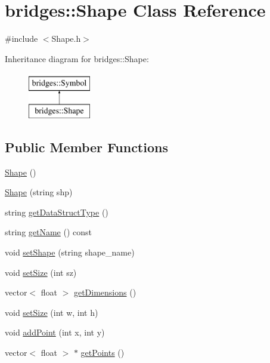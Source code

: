 \hypertarget{classbridges_1_1_shape}{}\section{bridges\+:\+:Shape Class Reference}
\label{classbridges_1_1_shape}


{\ttfamily \#include $<$Shape.\+h$>$}

Inheritance diagram for bridges\+:\+:Shape\+:\begin{figure}[H]
\begin{center}
\leavevmode
\includegraphics[height=2.000000cm]{classbridges_1_1_shape}
\end{center}
\end{figure}
\subsection*{Public Member Functions}
\begin{DoxyCompactItemize}
\item 
\mbox{\hyperlink{classbridges_1_1_shape_a1bab5bd0c3c89c6274a5a309b2aa184a}{Shape}} ()
\item 
\mbox{\hyperlink{classbridges_1_1_shape_a5ad5fa644f2c62c156427d0fef463f5b}{Shape}} (string shp)
\item 
string \mbox{\hyperlink{classbridges_1_1_shape_ac1aa859856aad0bac2716f98e87028ba}{get\+Data\+Struct\+Type}} ()
\item 
string \mbox{\hyperlink{classbridges_1_1_shape_a0365e2488fdaca0a2815be49dec93105}{get\+Name}} () const
\item 
void \mbox{\hyperlink{classbridges_1_1_shape_aed60b6e9a673eebc2b53d9053227a7c5}{set\+Shape}} (string shape\+\_\+name)
\item 
void \mbox{\hyperlink{classbridges_1_1_shape_a0fa2dae24c7ea2654b54e03adcdefa67}{set\+Size}} (int sz)
\item 
vector$<$ float $>$ \mbox{\hyperlink{classbridges_1_1_shape_a51efcce7a516ec5feeead962ad87e8b8}{get\+Dimensions}} ()
\item 
void \mbox{\hyperlink{classbridges_1_1_shape_ae90702ee6a0cfd866eec71c5f6ec0559}{set\+Size}} (int w, int h)
\item 
void \mbox{\hyperlink{classbridges_1_1_shape_a94fd45e9adb2b4e5da19e0a0288c11cb}{add\+Point}} (int x, int y)
\item 
vector$<$ float $>$ $\ast$ \mbox{\hyperlink{classbridges_1_1_shape_a564705d44df51d18e12c35304f5f678c}{get\+Points}} ()
\end{DoxyCompactItemize}
